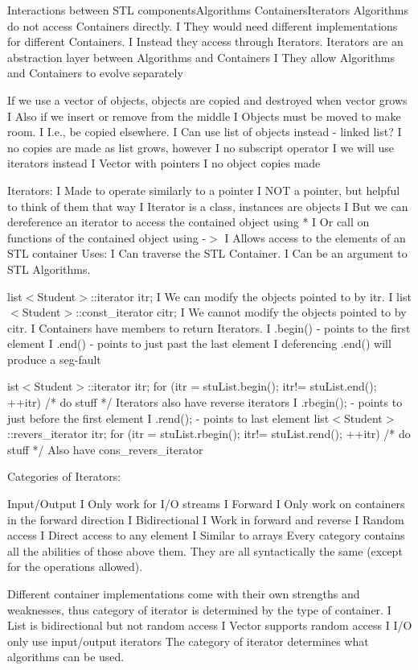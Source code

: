 \documentclass{article}
\begin{document}
{Interactions between STL componentsAlgorithms ContainersIterators
Algorithms do not access Containers directly.
I They would need different implementations for different Containers.
I Instead they access through Iterators.
Iterators are an abstraction layer between Algorithms and Containers
I They allow Algorithms and Containers to evolve separately

If we use a vector of objects, objects are copied and destroyed when vector grows
I Also if we insert or remove from the middle
I Objects must be moved to make room.
I I.e., be copied elsewhere.
I Can use list of objects instead - linked list?
I no copies are made as list grows, however
I no subscript operator
I we will use iterators instead
I Vector with pointers
I no object copies made

Iterators:
I Made to operate similarly to a pointer
I NOT a pointer, but helpful to think of them that way
I Iterator is a class, instances are objects
I But we can dereference an iterator to access the contained object using *
I Or call on functions of the contained object using -$>$
I Allows access to the elements of an STL container
Uses:
I Can traverse the STL Container.
I Can be an argument to STL Algorithms.

list$<$Student$>$::iterator itr;
I We can modify the objects pointed to by itr.
I list$<$Student$>$::const\_iterator citr;
I We cannot modify the objects pointed to by citr.
I Containers have members to return Iterators.
I .begin() - points to the first element
I .end() - points to just past the last element
I deferencing .end() will produce a seg-fault


ist$<$Student$>$::iterator itr;
for (itr = stuList.begin(); itr!= stuList.end(); ++itr) {/* do stuff
*/}
Iterators also have reverse iterators
I .rbegin(); - points to just before the first element
I .rend(); - points to last element
list$<$Student$>$::revers\_iterator itr;
for (itr = stuList.rbegin(); itr!= stuList.rend(); ++itr) {/* do
stuff */}
Also have cons\_revers\_iterator

Categories of Iterators:

Input/Output
I Only work for I/O streams
I Forward
I Only work on containers in the forward direction
I Bidirectional
I Work in forward and reverse
I Random access
I Direct access to any element
I Similar to arrays
Every category contains all the abilities of those above them.
They are all syntactically the same (except for the operations allowed).

Different container implementations come with their own strengths and weaknesses,
thus category of iterator is determined by the type of container.
I List is bidirectional but not random access
I Vector supports random access
I I/O only use input/output iterators
The category of iterator determines what algorithms can be used.


}
\end{document}
